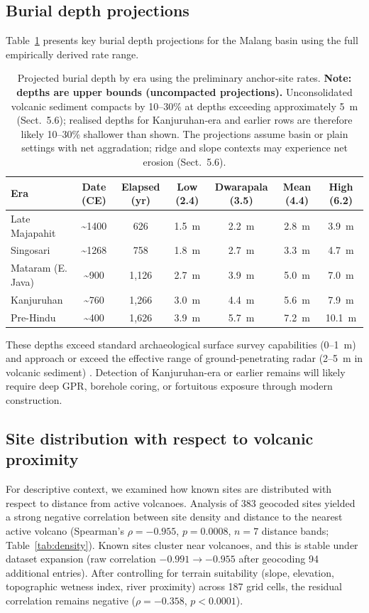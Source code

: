 \documentclass[12pt,a4paper]{article}
\begin{document}
\subsection{Burial depth projections}

Table~\ref{tab:depth} presents key burial depth projections for the Malang basin using the full empirically derived rate range.

\begin{table}[t]
\caption{Projected burial depth by era using the preliminary anchor-site rates. \textbf{Note: depths are upper bounds (uncompacted projections).} Unconsolidated volcanic sediment compacts by 10--30\% at depths exceeding approximately 5~m (Sect.~5.6); realised depths for Kanjuruhan-era and earlier rows are therefore likely 10--30\% shallower than shown. The projections assume basin or plain settings with net aggradation; ridge and slope contexts may experience net erosion (Sect.~5.6).}
\label{tab:depth}
\begin{tabular}{lcccccc}
\toprule
Era & Date (CE) & Elapsed (yr) & Low (2.4) & Dwarapala (3.5) & Mean (4.4) & High (6.2) \\
\midrule
Late Majapahit & \textasciitilde1400 & 626 & 1.5~m & 2.2~m & 2.8~m & 3.9~m \\
Singosari & \textasciitilde1268 & 758 & 1.8~m & 2.7~m & 3.3~m & 4.7~m \\
Mataram (E. Java) & \textasciitilde900 & 1,126 & 2.7~m & 3.9~m & 5.0~m & 7.0~m \\
Kanjuruhan & \textasciitilde760 & 1,266 & 3.0~m & 4.4~m & 5.6~m & 7.9~m \\
Pre-Hindu & \textasciitilde400 & 1,626 & 3.9~m & 5.7~m & 7.2~m & 10.1~m \\
\bottomrule
\end{tabular}
\end{table}

These depths exceed standard archaeological surface survey capabilities (0--1~m) and approach or exceed the effective range of ground-penetrating radar (2--5~m in volcanic sediment) \citep{conyers2004,goodman2013}. Detection of Kanjuruhan-era or earlier remains will likely require deep GPR, borehole coring, or fortuitous exposure through modern construction.

\subsection{Site distribution with respect to volcanic proximity}

For descriptive context, we examined how known sites are distributed with respect to distance from active volcanoes. Analysis of 383 geocoded sites yielded a strong negative correlation between site density and distance to the nearest active volcano (Spearman's $\rho = -0.955$, $p = 0.0008$, $n = 7$ distance bands; Table~\ref{tab:density}). Known sites cluster near volcanoes, and this is stable under dataset expansion (raw correlation $-0.991 \to -0.955$ after geocoding 94 additional entries). After controlling for terrain suitability (slope, elevation, topographic wetness index, river proximity) across 187 grid cells, the residual correlation remains negative ($\rho = -0.358$, $p < 0.0001$).
\end{document}
